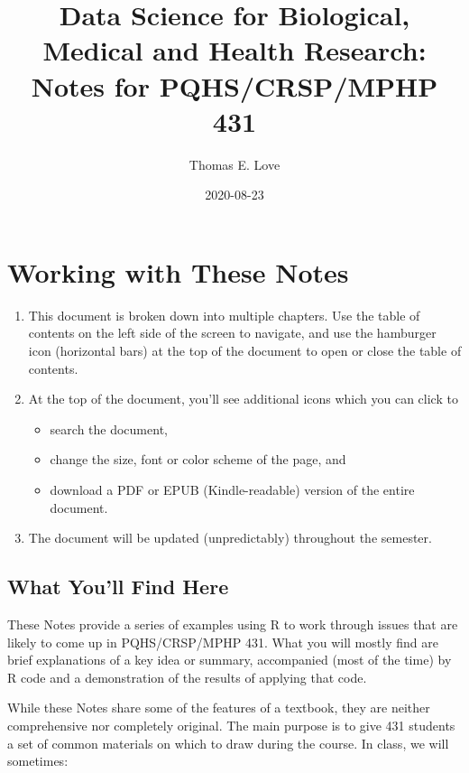 \documentclass[
]{book}
\title{Data Science for Biological, Medical and Health Research: Notes for PQHS/CRSP/MPHP 431}
\author{Thomas E. Love}
\date{2020-08-23}
\providecommand{\tightlist}{%
  \setlength{\itemsep}{0pt}\setlength{\parskip}{0pt}}
\begin{document}
\maketitle

{
\setcounter{tocdepth}{1}
\tableofcontents
}
\hypertarget{working-with-these-notes}{%
\chapter*{Working with These Notes}\label{working-with-these-notes}}

\begin{enumerate}
\def\labelenumi{\arabic{enumi}.}
\tightlist
\item
  This document is broken down into multiple chapters. Use the table of contents on the left side of the screen to navigate, and use the hamburger icon (horizontal bars) at the top of the document to open or close the table of contents.
\item
  At the top of the document, you'll see additional icons which you can click to

  \begin{itemize}
  \tightlist
  \item
    search the document,
  \item
    change the size, font or color scheme of the page, and
  \item
    download a PDF or EPUB (Kindle-readable) version of the entire document.
  \end{itemize}
\item
  The document will be updated (unpredictably) throughout the semester.
\end{enumerate}

\hypertarget{what-youll-find-here}{%
\section*{What You'll Find Here}\label{what-youll-find-here}}

These Notes provide a series of examples using R to work through issues that are likely to come up in PQHS/CRSP/MPHP 431. What you will mostly find are brief explanations of a key idea or summary, accompanied (most of the time) by R code and a demonstration of the results of applying that code.

While these Notes share some of the features of a textbook, they are neither comprehensive nor completely original. The main purpose is to give 431 students a set of common materials on which to draw during the course. In class, we will sometimes:
\end{document}
